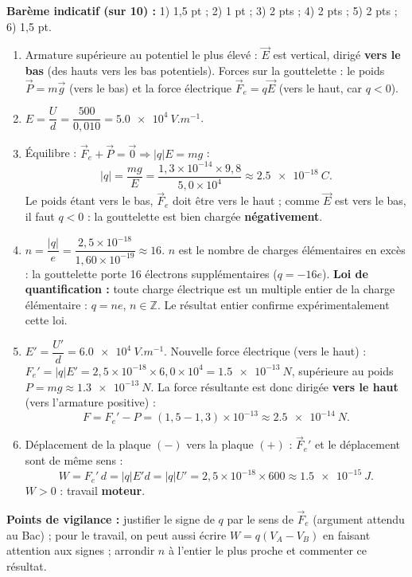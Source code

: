 \documentclass[11pt]{article}
\begin{document}
\begin{corrige}
\textbf{Barème indicatif (sur 10) :} 1) 1,5 pt ; 2) 1 pt ; 3) 2 pts ; 4) 2 pts ; 5) 2 pts ; 6) 1,5 pt.
\begin{enumerate}
\item Armature supérieure au potentiel le plus élevé : $\vec{E}$ est vertical, dirigé \textbf{vers le bas} (des hauts vers les bas potentiels). Forces sur la gouttelette : le poids $\vec{P} = m\vec{g}$ (vers le bas) et la force électrique $\vec{F}_e = q\vec{E}$ (vers le haut, car $q<0$).
\item $E = \dfrac{U}{d} = \dfrac{500}{0,010} = \SI{5,0e4}{V.m^{-1}}$.
\item Équilibre : $\vec{F}_e + \vec{P} = \vec{0} \Rightarrow |q|E = mg$ :
\[ |q| = \frac{mg}{E} = \frac{1,3\times 10^{-14}\times 9,8}{5,0\times 10^{4}} \approx \SI{2,5e-18}{C}. \]
Le poids étant vers le bas, $\vec{F}_e$ doit être vers le haut ; comme $\vec{E}$ est vers le bas, il faut $q<0$ : la gouttelette est bien chargée \textbf{négativement}.
\item $n = \dfrac{|q|}{e} = \dfrac{2,5\times 10^{-18}}{1,60\times 10^{-19}} \approx 16$.
$n$ est le nombre de charges élémentaires en excès : la gouttelette porte 16 électrons supplémentaires ($q = -16e$).
\textbf{Loi de quantification :} toute charge électrique est un multiple entier de la charge élémentaire : $q = ne$, $n\in\mathbb{Z}$. Le résultat entier confirme expérimentalement cette loi.
\item $E' = \dfrac{U'}{d} = \SI{6,0e4}{V.m^{-1}}$. Nouvelle force électrique (vers le haut) :
$F_e' = |q|E' = 2,5\times 10^{-18}\times 6,0\times 10^{4} = \SI{1,5e-13}{N}$, supérieure au poids $P = mg \approx \SI{1,3e-13}{N}$.
La force résultante est donc dirigée \textbf{vers le haut} (vers l'armature positive) :
\[ F = F_e' - P = (1,5 - 1,3)\times 10^{-13} \approx \SI{2,5e-14}{N}. \]
\item Déplacement de la plaque $(-)$ vers la plaque $(+)$ : $\vec{F}_e'$ et le déplacement sont de même sens :
\[ W = F_e'\, d = |q|E'd = |q|U' = 2,5\times 10^{-18}\times 600 \approx \SI{1,5e-15}{J}. \]
$W > 0$ : travail \textbf{moteur}.
\end{enumerate}
\textbf{Points de vigilance :} justifier le signe de $q$ par le sens de $\vec{F}_e$ (argument attendu au Bac) ; pour le travail, on peut aussi écrire $W = q(V_A - V_B)$ en faisant attention aux signes ; arrondir $n$ à l'entier le plus proche et commenter ce résultat.
\end{corrige}
\end{document}
